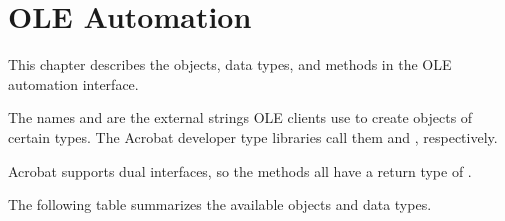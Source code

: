 \documentclass[letterpaper,12pt,english,openany,oneside]{sphinxmanual}
\begin{document}
\chapter{OLE Automation}
\label{\detokenize{IAC_API_OLE_Objects:ole-automation}}\label{\detokenize{IAC_API_OLE_Objects::doc}}
This chapter describes the objects, data types, and methods in the OLE automation interface.

The names  and  are the external strings OLE clients use to create objects of certain types. The Acrobat developer type libraries call them  and , respectively.

Acrobat supports dual interfaces, so the methods all have a return type of .

The following table summarizes the available objects and data types.
\end{document}

